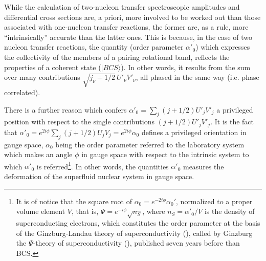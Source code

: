 While the calculation of two-nucleon transfer spectroscopic amplitudes and differential cross sections are, a priori, more involved to be worked out than those associated with one-nucleon transfer reactions, the former are, as a rule, more ``intrinsically'' accurate than the latter ones. This is because, in the case of two nucleon transfer reactions, the quantity (order parameter $\alpha'_0$) which expresses the collectivity of the members of a pairing rotational band, reflects the properties of a coherent state ($|BCS\rangle$). In other words, it results from the sum over many contributions $\sqrt{j_{\nu}+1/2}\,U'_\nu V'_\nu$, all phased in the same way (i.e. phase correlated).

There is a further reason which confers $\alpha'_0=\sum_j(j+1/2)U'_jV'_j$ a privileged position with respect to the single contributions $(j+1/2)U'_jV'_j$. It is the fact that $\alpha'_0=e^{2i\phi}\sum_j(j+1/2)U_jV_j=e^{2i\phi}\alpha_0$ defines a privileged orientation in gauge space, $\alpha_0$ being the order parameter referred to the laboratory system which makes an angle $\phi$ in gauge space with respect to the intrinsic system to which $\alpha'_0$ is referred\footnote{It is of notice that the square root of $\alpha_0=e^{-2i\phi}\alpha_0'$, normalized to a proper volume element $V$, that is, $\Psi=e^{-i\phi}\sqrt{n_S}$, where $n_S=\alpha'_0/V$ is the density of superconducting electrons, which constitutes the order parameter at the basis of the Ginzburg-Landau theory of superconductivity (\cite{Ginzburg:50}), called by Ginzburg the $\Psi$-theory of superconductivity (\cite{Ginzburg:04}), published seven years before than BCS.}. In other words, the quantities $\alpha'_0$  measures the deformation of the superfluid nuclear system in gauge space. 

